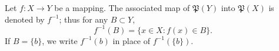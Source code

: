 Let $f: X \rightarrow Y$ be a mapping. The associated map of $\mathfrak{P}(Y)$ into $\mathfrak{P}(X)$ is denoted by $f^{-1}$; thus for any $B \subset Y$,
$$f^{-1}(B) = \{x \in X: f(x) \in B\}.$$
If $B = \{b\}$, we write $f^{-1}(b)$ in place of $f^{-1}(\{b\})$.
